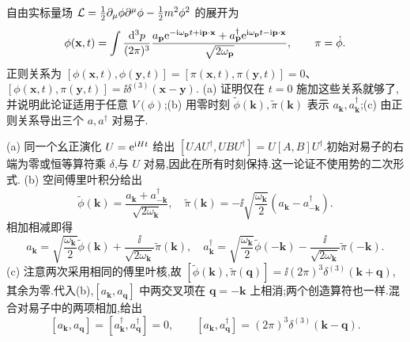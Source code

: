 \begin{exercise}
自由实标量场 $\mathcal L=\tfrac12\partial_\mu\phi\partial^\mu\phi-\tfrac12m^2\phi^2$ 的展开为
\[
\phi(\mathbf x,t)=\int\frac{\mathrm d^3p}{(2\pi)^3}\frac{a_{\mathbf p}\mathrm e^{-\mathrm i\omega_{\mathbf p}t+\mathrm i\mathbf p\cdot\mathbf x}+a^\dagger_{\mathbf p}\mathrm e^{\mathrm i\omega_{\mathbf p}t-\mathrm i\mathbf p\cdot\mathbf x}}{\sqrt{2\omega_{\mathbf p}}},\qquad \pi=\dot\phi.
\]
正则关系为 $[\phi(\mathbf x,t),\phi(\mathbf y,t)]=[\pi(\mathbf x,t),\pi(\mathbf y,t)]=0$、$[\phi(\mathbf x,t),\pi(\mathbf y,t)]=\ii\delta^{(3)}(\mathbf x-\mathbf y)$.
(a) 证明仅在 $t=0$ 施加这些关系就够了,并说明此论证适用于任意 $V(\phi)$;(b) 用零时刻 $\widetilde\phi(\mathbf k),\widetilde\pi(\mathbf k)$ 表示 $a_{\mathbf k},a^\dagger_{\mathbf k}$;(c) 由正则关系导出三个 $a,a^\dagger$ 对易子.
\end{exercise}
\begin{solution}
(a) 同一个幺正演化 $U=\mathrm e^{\mathrm i Ht}$ 给出 $[UAU^\dagger,UBU^\dagger]=U[A,B]U^\dagger$.初始对易子的右端为零或恒等算符乘 $\delta$,与 $U$ 对易,因此在所有时刻保持.这一论证不使用势的二次形式.
(b) 空间傅里叶积分给出
\[
\widetilde\phi(\mathbf k)=\frac{a_{\mathbf k}+a^\dagger_{-\mathbf k}}{\sqrt{2\omega_{\mathbf k}}},\quad
\widetilde\pi(\mathbf k)=-\ii\sqrt{\frac{\omega_{\mathbf k}}2}(a_{\mathbf k}-a^\dagger_{-\mathbf k}).
\]
相加相减即得
\[
a_{\mathbf k}=\sqrt{\frac{\omega_{\mathbf k}}2}\widetilde\phi(\mathbf k)+\frac{\ii}{\sqrt{2\omega_{\mathbf k}}}\widetilde\pi(\mathbf k),\quad
a^\dagger_{\mathbf k}=\sqrt{\frac{\omega_{\mathbf k}}2}\widetilde\phi(-\mathbf k)-\frac{\ii}{\sqrt{2\omega_{\mathbf k}}}\widetilde\pi(-\mathbf k).
\]
(c) 注意两次采用相同的傅里叶核,故 $[\widetilde\phi(\mathbf k),\widetilde\pi(\mathbf q)]=\ii(2\pi)^3\delta^{(3)}(\mathbf k+\mathbf q)$,其余为零.代入(b),$[a_{\mathbf k},a_{\mathbf q}]$ 中两交叉项在 $\mathbf q=-\mathbf k$ 上相消;两个创造算符也一样.混合对易子中的两项相加,给出
\[
[a_{\mathbf k},a_{\mathbf q}]=[a^\dagger_{\mathbf k},a^\dagger_{\mathbf q}]=0,\qquad
[a_{\mathbf k},a^\dagger_{\mathbf q}]=(2\pi)^3\delta^{(3)}(\mathbf k-\mathbf q).
\]
\end{solution}

